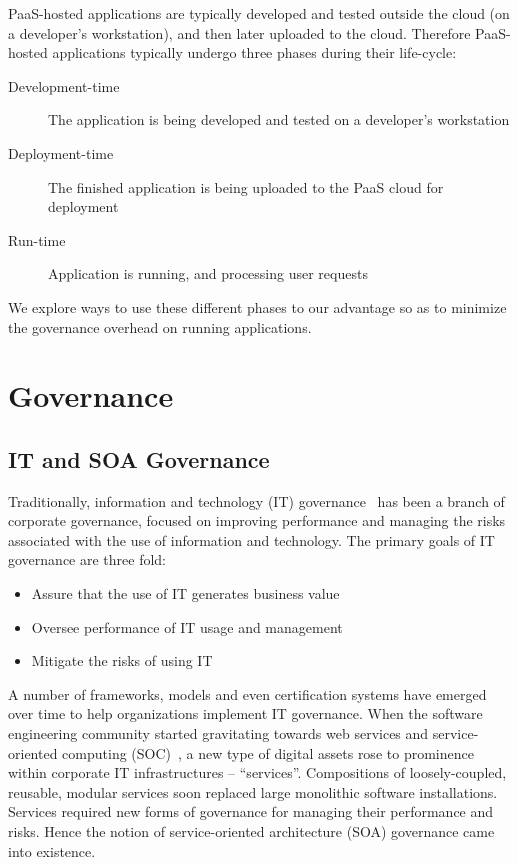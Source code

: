 PaaS-hosted applications are typically developed and tested outside the cloud (on a developer's workstation), 
and then later uploaded to the cloud. Therefore PaaS-hosted applications typically undergo three phases 
during their life-cycle:
\begin{description}
\item[Development-time] The application is being developed and tested on a developer's workstation
\item[Deployment-time] The finished application is being uploaded to the PaaS cloud for deployment
\item[Run-time] Application is running, and processing user requests
\end{description}
We explore ways to use these different phases to our advantage so as to minimize the governance
overhead on running applications. 

\section{Governance}
\subsection{IT and SOA Governance}
Traditionally, information and technology (IT) governance~\cite{brown2005framing} has been a branch of 
corporate governance, focused on
improving performance and managing the risks associated with the use of information and technology. The primary
goals of IT governance are three fold:

\begin{itemize}
\item Assure that the use of IT generates business value
\item Oversee performance of IT usage and management
\item Mitigate the risks of using IT
\end{itemize}

A number of frameworks, models and even certification systems have emerged over time to help organizations 
implement IT governance. When the software engineering community started gravitating towards web services and
service-oriented computing (SOC)~\cite{1254461, what-is-soa}, a new type of digital assets rose to prominence within corporate IT 
infrastructures -- ``services''. Compositions of loosely-coupled, reusable, modular services soon replaced 
large monolithic software
installations. Services required new forms of governance for managing their performance
and risks. Hence the notion of service-oriented architecture (SOA) governance came into existence. 

